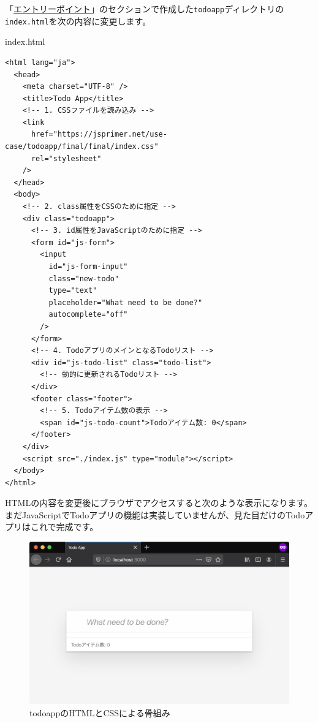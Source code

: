 「\hyperlink{entrypoint_todo}{エントリーポイント}」のセクションで作成した\texttt{todoapp}ディレクトリの\texttt{index.html}を次の内容に変更します。

\begin{listtitle}
index.html
\end{listtitle}
\begin{lstlisting}
<html lang="ja">
  <head>
    <meta charset="UTF-8" />
    <title>Todo App</title>
    <!-- 1. CSSファイルを読み込み -->
    <link
      href="https://jsprimer.net/use-case/todoapp/final/final/index.css"
      rel="stylesheet"
    />
  </head>
  <body>
    <!-- 2. class属性をCSSのために指定 -->
    <div class="todoapp">
      <!-- 3. id属性をJavaScriptのために指定 -->
      <form id="js-form">
        <input
          id="js-form-input"
          class="new-todo"
          type="text"
          placeholder="What need to be done?"
          autocomplete="off"
        />
      </form>
      <!-- 4. TodoアプリのメインとなるTodoリスト -->
      <div id="js-todo-list" class="todo-list">
        <!-- 動的に更新されるTodoリスト -->
      </div>
      <footer class="footer">
        <!-- 5. Todoアイテム数の表示 -->
        <span id="js-todo-count">Todoアイテム数: 0</span>
      </footer>
    </div>
    <script src="./index.js" type="module"></script>
  </body>
</html>
\end{lstlisting}
\listend

HTMLの内容を変更後にブラウザでアクセスすると次のような表示になります。
まだJavaScriptでTodoアプリの機能は実装していませんが、見た目だけのTodoアプリはこれで完成です。

\begin{figure}[h]
\centering
\includegraphics[width=120mm]{./fig/todo-html.png}
\caption{todoappのHTMLとCSSによる骨組み}
\end{figure}

